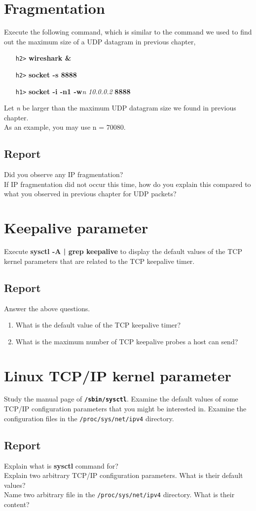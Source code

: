 \documentclass[10pt,a4paper]{article}
\numberwithin{equation}{section}
\numberwithin{figure}{section}
\numberwithin{table}{section}
\begin{document}
\section*{Fragmentation}
    Execute the following command, which is similar to the command we used to find out the maximum size of a UDP datagram in previous chapter, \\
    \begin{itemize}
        \item [\texttt{h2>}] \textbf{wireshark \&}
        \item [\texttt{h2>}] \textbf{socket -s 8888} 
        \item [\texttt{h1>}] \textbf{socket -i -n1 -w}\textit{n} \textit{10.0.0.2} \textbf{8888} 
    \end{itemize}
    Let \textit{n} be larger than the maximum UDP datagram size we found in previous chapter. \\
    As an example, you may use n = 70080.
    \subsection*{Report}
    Did you observe any IP fragmentation? \\
    If IP fragmentation did not occur this time, how do you explain this compared to what you observed in previous chapter for UDP packets?

\section*{Keepalive parameter}
    Execute \textbf{sysctl -A | grep keepalive} to display the default values of the TCP kernel parameters that are related to the TCP keepalive timer. \\
    \subsection*{Report}
    Answer the above questions.
	\begin{enumerate}
		\item What is the default value of the TCP keepalive timer?
		\item What is the maximum number of TCP keepalive probes a host can send?
    \end{enumerate}

\section*{Linux TCP/IP kernel parameter}
    Study the manual page of \textbf{\texttt{/sbin/sysctl}}.
    Examine the default values of some TCP/IP configuration parameters that you might be interested in.
    Examine the configuration files in the \texttt{/proc/sys/net/ipv4} directory.
    \subsection*{Report}
    Explain what is \textbf{sysctl} command for? \\
    Explain two arbitrary TCP/IP configuration parameters.
    What is their default values? \\
    Name two arbitrary file in the \texttt{/proc/sys/net/ipv4} directory.
	What is their content?
	
\end{document}
